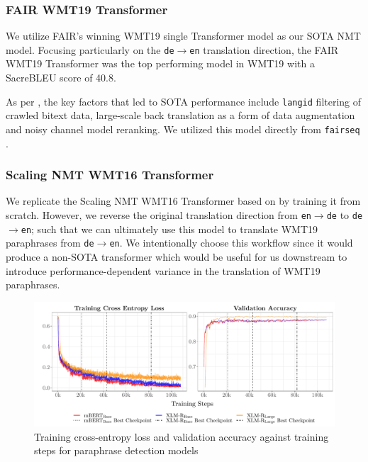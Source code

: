 \documentclass[11pt,a4paper]{article}
\begin{document}
\subsubsection{FAIR WMT19 Transformer}

We utilize FAIR's winning WMT19 single Transformer model as our SOTA NMT model. Focusing particularly on the \texttt{de$\rightarrow$en} translation direction, the FAIR WMT19 Transformer was the top performing model in WMT19 with a SacreBLEU \cite{post-2018-call} score of 40.8.

As per \citet{ng2019facebook}, the key factors that led to SOTA performance include \texttt{langid} filtering of crawled bitext data, large-scale back translation as a form of data augmentation and noisy channel model reranking. We utilized this model directly from \texttt{fairseq} \cite{ott2019fairseq}. 

\subsubsection{Scaling NMT WMT16 Transformer}

We replicate the Scaling NMT WMT16 Transformer based on \citet{ott2018scaling} by training it from scratch. However, we reverse the original translation direction from \texttt{en$\rightarrow$de} to \texttt{de$\rightarrow$en}; such that we can ultimately use this model to translate WMT19 paraphrases from \texttt{de$\rightarrow$en}. We intentionally choose this workflow since it would produce a non-SOTA transformer which would be useful for us downstream to introduce performance-dependent variance in the translation of WMT19 paraphrases.

\begin{figure}
  \centering 
  \includegraphics[trim={0.7cm 0cm 0cm 0cm},clip,width=\textwidth]{paraphrase_detection_models_evolution.pdf}
  \caption{Training cross-entropy loss and validation accuracy against training steps for paraphrase detection models}
  \label{paraphrase_detection_model_evolution}
\end{figure}
\end{document}
